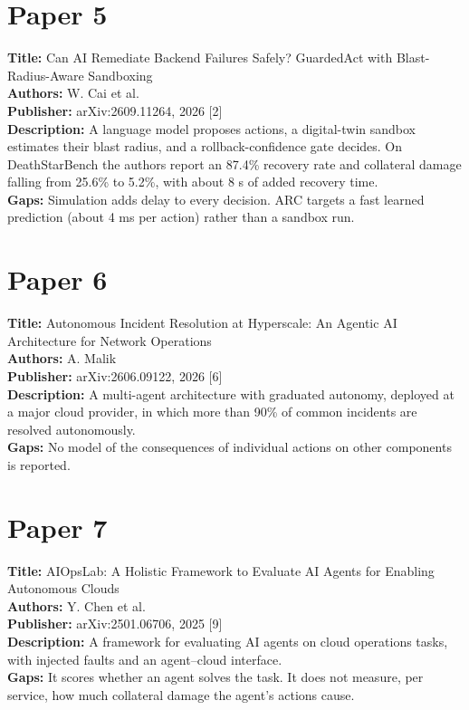 \documentclass[12pt,a4paper]{report}
\begin{document}
\section{Paper 5}
\noindent\textbf{Title:} Can AI Remediate Backend Failures Safely? GuardedAct with Blast-Radius-Aware Sandboxing\\
\textbf{Authors:} W. Cai et al.\\
\textbf{Publisher:} arXiv:2609.11264, 2026 [2]\\
\textbf{Description:} A language model proposes actions, a digital-twin sandbox estimates their blast radius, and a rollback-confidence gate decides. On DeathStarBench the authors report an 87.4\% recovery rate and collateral damage falling from 25.6\% to 5.2\%, with about 8 s of added recovery time.\\
\textbf{Gaps:} Simulation adds delay to every decision. ARC targets a fast learned prediction (about 4 ms per action) rather than a sandbox run.

\section{Paper 6}
\noindent\textbf{Title:} Autonomous Incident Resolution at Hyperscale: An Agentic AI Architecture for Network Operations\\
\textbf{Authors:} A. Malik\\
\textbf{Publisher:} arXiv:2606.09122, 2026 [6]\\
\textbf{Description:} A multi-agent architecture with graduated autonomy, deployed at a major cloud provider, in which more than 90\% of common incidents are resolved autonomously.\\
\textbf{Gaps:} No model of the consequences of individual actions on other components is reported.

\section{Paper 7}
\noindent\textbf{Title:} AIOpsLab: A Holistic Framework to Evaluate AI Agents for Enabling Autonomous Clouds\\
\textbf{Authors:} Y. Chen et al.\\
\textbf{Publisher:} arXiv:2501.06706, 2025 [9]\\
\textbf{Description:} A framework for evaluating AI agents on cloud operations tasks, with injected faults and an agent--cloud interface.\\
\textbf{Gaps:} It scores whether an agent solves the task. It does not measure, per service, how much collateral damage the agent's actions cause.
\end{document}
